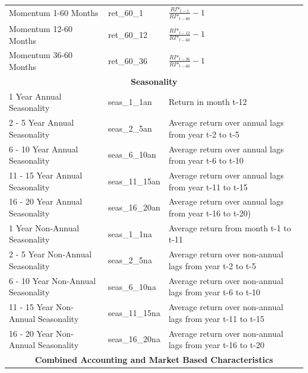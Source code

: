 \documentclass[12pt,title,fleqn]{article}
\begin{document}
{\begin{longtable}{@{\extracolsep{\fill}}|m{5cm}|l|m{8cm}|@{}}
	Momentum 1-60 Months & ret\_60\_1 &$\frac{RI\mbox{*}_{t-1}}{RI\mbox{*}_{t-60}} - 1$\\
	
	Momentum 12-60 Months & ret\_60\_12 &$\frac{RI\mbox{*}_{t-12}}{RI\mbox{*}_{t-60}} - 1$\\
	
	Momentum 36-60 Months & ret\_60\_36 &$\frac{RI\mbox{*}_{t-36}}{RI\mbox{*}_{t-60}} - 1$\\
	
	\hline 
	\multicolumn{3}{|c|}{\textbf{Seasonality}} \\
	\hline 	
		
	1 Year Annual Seasonality & seas\_1\_1an & Return in month t-12 \\
		
	2 - 5 Year Annual Seasonality & seas\_2\_5an & Average return over annual lags from year t-2 to t-5 \\
		
	6 - 10 Year Annual Seasonality & seas\_6\_10an &Average return over annual lags from year t-6 to t-10 \\
		
	11 - 15 Year Annual Seasonality & seas\_11\_15an & Average return over annual lags from year t-11 to t-15 \\
		
	16 - 20 Year Annual Seasonality & seas\_16\_20an & Average return over annual lags from year t-16 to t-20) \\
		
	1 Year Non-Annual Seasonality & seas\_1\_1na & Average return from month t-1 to t-11 \\
		
	2 - 5 Year Non-Annual Seasonality & seas\_2\_5na & Average return over non-annual lags from year t-2 to t-5 \\
		
	6 - 10 Year Non-Annual Seasonality & seas\_6\_10na & Average return over non-annual lags from year t-6 to t-10 \\
		
	11 - 15 Year Non-Annual Seasonality & seas\_11\_15na & Average return over non-annual lags from year t-11 to t-15 \\
		
	16 - 20 Year Non-Annual Seasonality & seas\_16\_20na & Average return over non-annual lags from year t-16 to t-20 \\
	
	\hline 
	\multicolumn{3}{|c|}{\textbf{Combined Accounting and Market Based Characteristics}} \\
	\hline 	
	

\end{longtable}}
\end{document}
